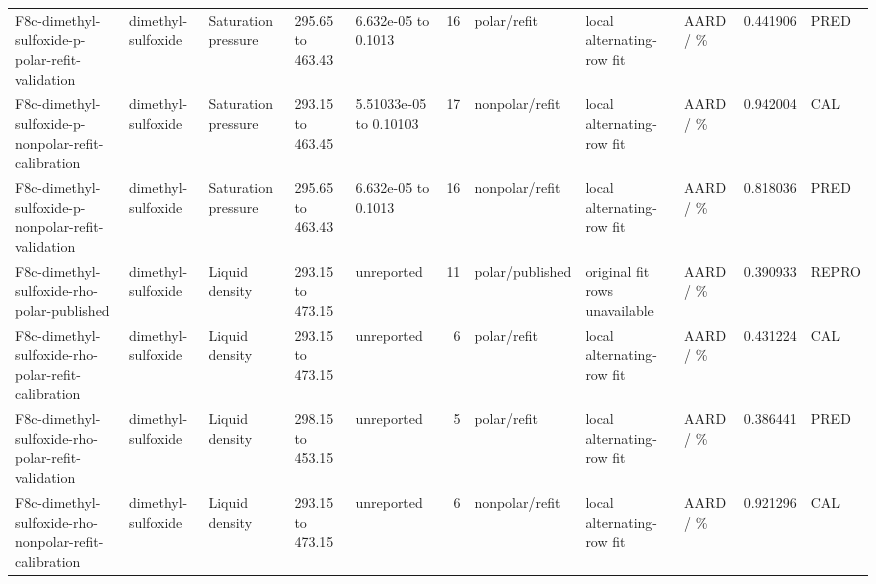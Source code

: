 \begin{landscape}
\begin{longtable}{L{1.9cm}L{2.5cm}L{2.1cm}L{1.6cm}L{1.6cm}rL{2.4cm}L{1.9cm}L{2.2cm}rL{1cm}}
F8c-\allowbreak{}dimethyl-\allowbreak{}sulfoxide-\allowbreak{}p-\allowbreak{}polar-\allowbreak{}refit-\allowbreak{}validation & dimethyl-\allowbreak{}sulfoxide & Saturation pressure & 295.65 to 463.43 & 6.632e-\allowbreak{}05 to 0.1013 & 16 & polar/\allowbreak{}refit & local alternating-\allowbreak{}row fit & AARD /\allowbreak{} \% & 0.441906 & PRED \\
F8c-\allowbreak{}dimethyl-\allowbreak{}sulfoxide-\allowbreak{}p-\allowbreak{}nonpolar-\allowbreak{}refit-\allowbreak{}calibration & dimethyl-\allowbreak{}sulfoxide & Saturation pressure & 293.15 to 463.45 & 5.51033e-\allowbreak{}05 to 0.10103 & 17 & nonpolar/\allowbreak{}refit & local alternating-\allowbreak{}row fit & AARD /\allowbreak{} \% & 0.942004 & CAL \\
F8c-\allowbreak{}dimethyl-\allowbreak{}sulfoxide-\allowbreak{}p-\allowbreak{}nonpolar-\allowbreak{}refit-\allowbreak{}validation & dimethyl-\allowbreak{}sulfoxide & Saturation pressure & 295.65 to 463.43 & 6.632e-\allowbreak{}05 to 0.1013 & 16 & nonpolar/\allowbreak{}refit & local alternating-\allowbreak{}row fit & AARD /\allowbreak{} \% & 0.818036 & PRED \\
F8c-\allowbreak{}dimethyl-\allowbreak{}sulfoxide-\allowbreak{}rho-\allowbreak{}polar-\allowbreak{}published & dimethyl-\allowbreak{}sulfoxide & Liquid density & 293.15 to 473.15 & unreported & 11 & polar/\allowbreak{}published & original fit rows unavailable & AARD /\allowbreak{} \% & 0.390933 & REPRO \\
F8c-\allowbreak{}dimethyl-\allowbreak{}sulfoxide-\allowbreak{}rho-\allowbreak{}polar-\allowbreak{}refit-\allowbreak{}calibration & dimethyl-\allowbreak{}sulfoxide & Liquid density & 293.15 to 473.15 & unreported & 6 & polar/\allowbreak{}refit & local alternating-\allowbreak{}row fit & AARD /\allowbreak{} \% & 0.431224 & CAL \\
F8c-\allowbreak{}dimethyl-\allowbreak{}sulfoxide-\allowbreak{}rho-\allowbreak{}polar-\allowbreak{}refit-\allowbreak{}validation & dimethyl-\allowbreak{}sulfoxide & Liquid density & 298.15 to 453.15 & unreported & 5 & polar/\allowbreak{}refit & local alternating-\allowbreak{}row fit & AARD /\allowbreak{} \% & 0.386441 & PRED \\
F8c-\allowbreak{}dimethyl-\allowbreak{}sulfoxide-\allowbreak{}rho-\allowbreak{}nonpolar-\allowbreak{}refit-\allowbreak{}calibration & dimethyl-\allowbreak{}sulfoxide & Liquid density & 293.15 to 473.15 & unreported & 6 & nonpolar/\allowbreak{}refit & local alternating-\allowbreak{}row fit & AARD /\allowbreak{} \% & 0.921296 & CAL \\

\end{longtable}
\end{landscape}
